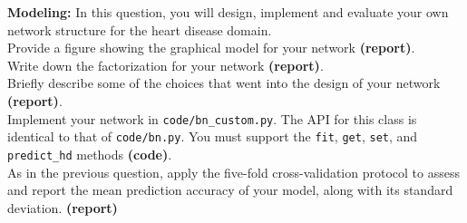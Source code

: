 \documentclass[11pt]{article}
\begin{document}
\begin{problem}{15} \textbf{Modeling:} In this question, you will design, implement and evaluate your own network structure for the heart disease domain. \\

  Provide a figure showing the graphical model for your network \textbf{(report)}. \\

  Write down the factorization for your network \textbf{(report)}.\\

  Briefly describe some of the choices that went into the design of your network \textbf{(report)}.\\

  Implement your network in \verb|code/bn_custom.py|. The API for this class is identical to that of \verb|code/bn.py|. You must support the \verb|fit|, \verb|get|, \verb|set|, and \verb|predict_hd| methods \textbf{(code)}. \\

  As in the previous question, apply the five-fold cross-validation protocol to assess and report the mean prediction accuracy of your model, along with its standard deviation. \textbf{(report)}

\end{problem}

\showpoints
\end{document}
